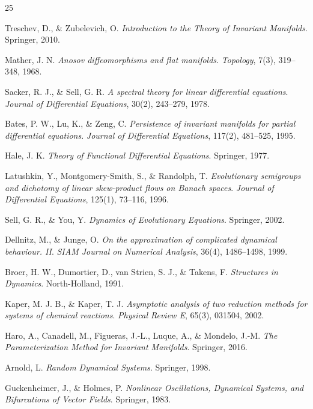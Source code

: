 \documentclass[11pt,a4paper]{article}
\theoremstyle{plain}
\theoremstyle{definition}
\theoremstyle{remark}
\numberwithin{equation}{section}
\numberwithin{figure}{section}
\begin{document}
\begin{thebibliography}{25}

 Treschev, D., \& Zubelevich, O. \textit{Introduction to the Theory of Invariant Manifolds}. Springer, 2010.

 Mather, J. N. \textit{Anosov diffeomorphisms and flat manifolds}. \textit{Topology}, 7(3), 319–348, 1968.

 Sacker, R. J., \& Sell, G. R. \textit{A spectral theory for linear differential equations}. \textit{Journal of Differential Equations}, 30(2), 243–279, 1978.

 Bates, P. W., Lu, K., \& Zeng, C. \textit{Persistence of invariant manifolds for partial differential equations}. \textit{Journal of Differential Equations}, 117(2), 481–525, 1995.

 Hale, J. K. \textit{Theory of Functional Differential Equations}. Springer, 1977.

 Latushkin, Y., Montgomery-Smith, S., \& Randolph, T. \textit{Evolutionary semigroups and dichotomy of linear skew-product flows on Banach spaces}. \textit{Journal of Differential Equations}, 125(1), 73–116, 1996.

 Sell, G. R., \& You, Y. \textit{Dynamics of Evolutionary Equations}. Springer, 2002.

 Dellnitz, M., \& Junge, O. \textit{On the approximation of complicated dynamical behaviour. II}. \textit{SIAM Journal on Numerical Analysis}, 36(4), 1486–1498, 1999.

 Broer, H. W., Dumortier, D., van Strien, S. J., \& Takens, F. \textit{Structures in Dynamics}. North-Holland, 1991.

 Kaper, M. J. B., \& Kaper, T. J. \textit{Asymptotic analysis of two reduction methods for systems of chemical reactions}. \textit{Physical Review E}, 65(3), 031504, 2002.

 Haro, A., Canadell, M., Figueras, J.-L., Luque, A., \& Mondelo, J.-M. \textit{The Parameterization Method for Invariant Manifolds}. Springer, 2016.

 Arnold, L. \textit{Random Dynamical Systems}. Springer, 1998.

 Guckenheimer, J., \& Holmes, P. \textit{Nonlinear Oscillations, Dynamical Systems, and Bifurcations of Vector Fields}. Springer, 1983.


\end{thebibliography}
\end{document}
